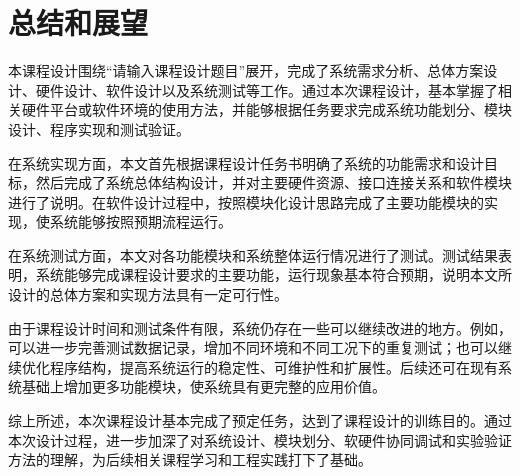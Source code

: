 \chapter*{总结和展望}

本课程设计围绕“请输入课程设计题目”展开，完成了系统需求分析、总体方案设计、硬件设计、软件设计以及系统测试等工作。通过本次课程设计，基本掌握了相关硬件平台或软件环境的使用方法，并能够根据任务要求完成系统功能划分、模块设计、程序实现和测试验证。

在系统实现方面，本文首先根据课程设计任务书明确了系统的功能需求和设计目标，然后完成了系统总体结构设计，并对主要硬件资源、接口连接关系和软件模块进行了说明。在软件设计过程中，按照模块化设计思路完成了主要功能模块的实现，使系统能够按照预期流程运行。

在系统测试方面，本文对各功能模块和系统整体运行情况进行了测试。测试结果表明，系统能够完成课程设计要求的主要功能，运行现象基本符合预期，说明本文所设计的总体方案和实现方法具有一定可行性。

由于课程设计时间和测试条件有限，系统仍存在一些可以继续改进的地方。例如，可以进一步完善测试数据记录，增加不同环境和不同工况下的重复测试；也可以继续优化程序结构，提高系统运行的稳定性、可维护性和扩展性。后续还可在现有系统基础上增加更多功能模块，使系统具有更完整的应用价值。

综上所述，本次课程设计基本完成了预定任务，达到了课程设计的训练目的。通过本次设计过程，进一步加深了对系统设计、模块划分、软硬件协同调试和实验验证方法的理解，为后续相关课程学习和工程实践打下了基础。